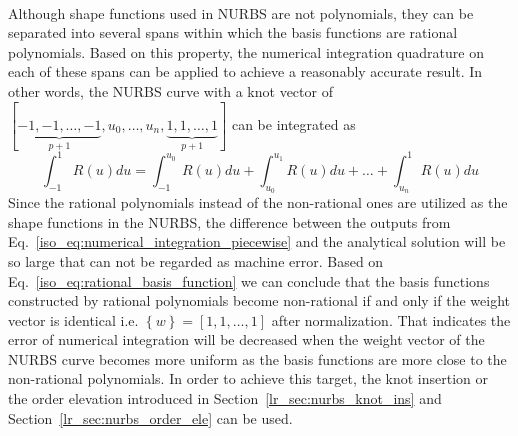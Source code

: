\paragraph{}
Although shape functions used in NURBS are not polynomials, they can be separated into several spans within which the basis functions are rational polynomials.
Based on this property, the numerical integration quadrature on each of these spans can be applied to achieve a reasonably accurate result.
In other words, the NURBS curve with a knot vector of 
$[ 
    \underbrace{-1,-1,\dots,-1}_{p+1}, 
    u_0,\dots,u_n, 
    \underbrace{1,1,\dots,1 }_{p+1}
]$
can be integrated as
\begin{equation}
    \int_{-1}^{1} R(u) du = \int_{-1}^{u_0} R(u)du + 
                            \int_{u_0}^{u_1} R(u)du + \dots +
                            \int_{u_n}^1 R(u)du
\label{iso_eq:numerical_integration_piecewise}
\end{equation}
%
Since the rational polynomials instead of the non-rational ones are utilized as the shape functions in the NURBS, the difference between the outputs from Eq.~\ref{iso_eq:numerical_integration_piecewise} and the analytical solution will be so large that can not be regarded as machine error.
Based on Eq.~\ref{iso_eq:rational_basis_function} we can conclude that the basis functions constructed by rational polynomials become non-rational if and only if the weight vector is identical i.e. $\left\{ w \right\} = \left[ 1,1,\dots,1 \right]$ after normalization.
That indicates the error of numerical integration will be decreased when the weight vector of the NURBS curve becomes more uniform as the basis functions are more close to the non-rational polynomials.
In order to achieve this target, the knot insertion or the order elevation introduced in Section~\ref{lr_sec:nurbs_knot_ins} and Section~\ref{lr_sec:nurbs_order_ele} can be used.
